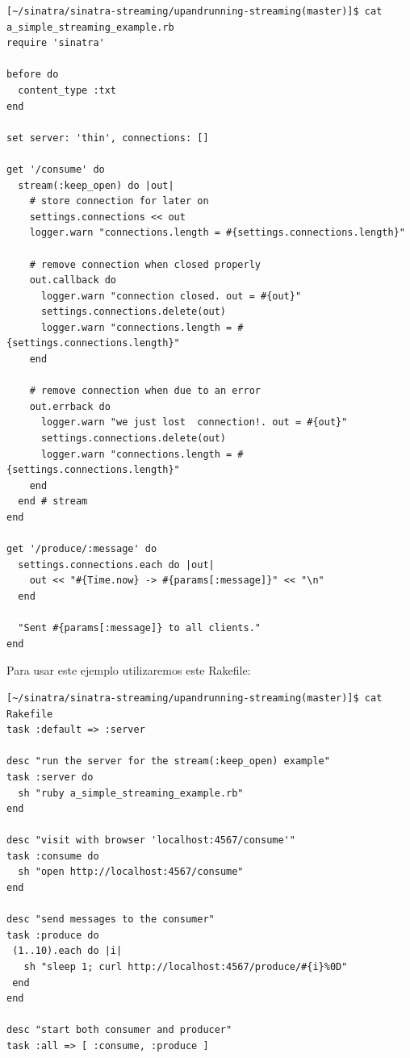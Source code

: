 \begin{verbatim}
[~/sinatra/sinatra-streaming/upandrunning-streaming(master)]$ cat a_simple_streaming_example.rb 
require 'sinatra'

before do
  content_type :txt
end

set server: 'thin', connections: []

get '/consume' do
  stream(:keep_open) do |out|
    # store connection for later on
    settings.connections << out
    logger.warn "connections.length = #{settings.connections.length}"

    # remove connection when closed properly
    out.callback do 
      logger.warn "connection closed. out = #{out}"
      settings.connections.delete(out) 
      logger.warn "connections.length = #{settings.connections.length}"
    end

    # remove connection when due to an error
    out.errback do
      logger.warn "we just lost  connection!. out = #{out}"
      settings.connections.delete(out)
      logger.warn "connections.length = #{settings.connections.length}"
    end
  end # stream
end

get '/produce/:message' do
  settings.connections.each do |out|
    out << "#{Time.now} -> #{params[:message]}" << "\n"
  end

  "Sent #{params[:message]} to all clients."
end
\end{verbatim}
Para usar este ejemplo utilizaremos este Rakefile:
\begin{verbatim}
[~/sinatra/sinatra-streaming/upandrunning-streaming(master)]$ cat Rakefile 
task :default => :server

desc "run the server for the stream(:keep_open) example"
task :server do
  sh "ruby a_simple_streaming_example.rb"
end

desc "visit with browser 'localhost:4567/consume'"
task :consume do
  sh "open http://localhost:4567/consume"
end

desc "send messages to the consumer"
task :produce do
 (1..10).each do |i|
   sh "sleep 1; curl http://localhost:4567/produce/#{i}%0D"
 end
end

desc "start both consumer and producer"
task :all => [ :consume, :produce ]
\end{verbatim}

